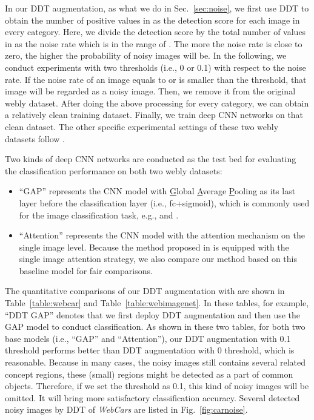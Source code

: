 \documentclass[twocolumn]{svjour3}          \smartqed  \usepackage{graphicx}
\begin{document}
In our DDT augmentation, as what we do in Sec.~\ref{sec:noise}, we first use DDT to obtain the number of positive values in  as the detection score for each image in every category. Here, we divide the detection score by the total number of values in  as the noise rate which is in the range of . The more the noise rate is close to zero, the higher the probability of noisy images will be. In the following, we conduct experiments with two thresholds (i.e., 0 or 0.1) with respect to the noise rate. If the noise rate of an image equals to or is smaller than the threshold, that image will be regarded as a noisy image. Then, we remove it from the original webly dataset. After doing the above processing for every category, we can obtain a relatively clean training dataset. Finally, we train deep CNN networks on that clean dataset. The other specific experimental settings of these two webly datasets follow \citet{bohan2017}.

Two kinds of deep CNN networks are conducted as the test bed for evaluating the classification performance on both two webly datasets:
\begin{itemize}
\item ``GAP'' represents the CNN model with \underline{G}lobal \underline{A}verage \underline{P}ooling as its last layer before the classification layer (i.e., fc+sigmoid), which is commonly used for the image classification task, e.g., \citet{szegedy2015going} and \citet{kaiming15residual}.
\item ``Attention'' represents the CNN model with the attention mechanism on the single image level. Because the method proposed in \citet{bohan2017} is equipped with the single image attention strategy, we also compare our method based on this baseline model for fair comparisons.
\end{itemize}

The quantitative comparisons of our DDT augmentation with \citet{bohan2017} are shown in Table~\ref{table:webcar} and Table~\ref{table:webimagenet}. In these tables, for example, ``DDT  GAP'' denotes that we first deploy DDT augmentation and then use the GAP model to conduct classification. As shown in these two tables, for both two base models (i.e., ``GAP'' and ``Attention''), our DDT augmentation with 0.1 threshold performs better than DDT augmentation with 0 threshold, which is reasonable. Because in many cases, the noisy images still contains several related concept regions, these (small) regions might be detected as a part of common objects. Therefore, if we set the threshold as 0.1, this kind of noisy images will be omitted. It will bring more satisfactory classification accuracy. Several detected noisy images by DDT of \emph{WebCars} are listed in Fig.~\ref{fig:carnoise}.
\end{document}
